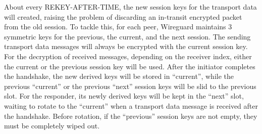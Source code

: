     About every \uppercase{REKEY-After-time}, the new session keys for the transport data will created,
    raising the problem of discarding an in-transit encrypted packet from the old session. To tackle this,
    for each peer, Wireguard maintains 3 symmetric keys for the previous, the current, and the next session.
    The sending transport data messages will always be encrypted with the current session key. For
    the decryption of received messages, depending on the receiver index, either the current 
    or the previous session key will be used. After the initiator completes the handshake, the new
    derived keys will be stored in ``current'', while the previous ``current'' or the previous ``next''
    session keys will be slid to the previous slot. For the responder, its newly derived keys will
    be kept in the ``next'' slot, waiting to rotate to the ``current'' when a transport data message
    is received after the handshake. Before rotation, if the ``previous'' session keys are not empty,
    they must be completely wiped out.



